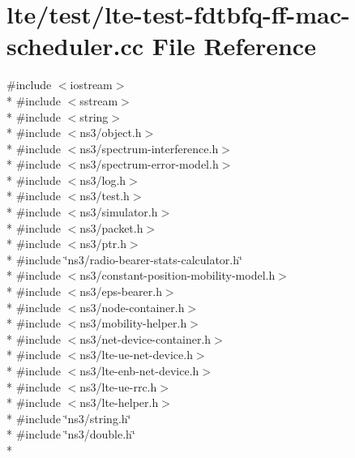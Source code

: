 \hypertarget{lte-test-fdtbfq-ff-mac-scheduler_8cc}{}\section{lte/test/lte-\/test-\/fdtbfq-\/ff-\/mac-\/scheduler.cc File Reference}
\label{lte-test-fdtbfq-ff-mac-scheduler_8cc}
{\ttfamily \#include $<$iostream$>$}\\*
{\ttfamily \#include $<$sstream$>$}\\*
{\ttfamily \#include $<$string$>$}\\*
{\ttfamily \#include $<$ns3/object.\+h$>$}\\*
{\ttfamily \#include $<$ns3/spectrum-\/interference.\+h$>$}\\*
{\ttfamily \#include $<$ns3/spectrum-\/error-\/model.\+h$>$}\\*
{\ttfamily \#include $<$ns3/log.\+h$>$}\\*
{\ttfamily \#include $<$ns3/test.\+h$>$}\\*
{\ttfamily \#include $<$ns3/simulator.\+h$>$}\\*
{\ttfamily \#include $<$ns3/packet.\+h$>$}\\*
{\ttfamily \#include $<$ns3/ptr.\+h$>$}\\*
{\ttfamily \#include \char`\"{}ns3/radio-\/bearer-\/stats-\/calculator.\+h\char`\"{}}\\*
{\ttfamily \#include $<$ns3/constant-\/position-\/mobility-\/model.\+h$>$}\\*
{\ttfamily \#include $<$ns3/eps-\/bearer.\+h$>$}\\*
{\ttfamily \#include $<$ns3/node-\/container.\+h$>$}\\*
{\ttfamily \#include $<$ns3/mobility-\/helper.\+h$>$}\\*
{\ttfamily \#include $<$ns3/net-\/device-\/container.\+h$>$}\\*
{\ttfamily \#include $<$ns3/lte-\/ue-\/net-\/device.\+h$>$}\\*
{\ttfamily \#include $<$ns3/lte-\/enb-\/net-\/device.\+h$>$}\\*
{\ttfamily \#include $<$ns3/lte-\/ue-\/rrc.\+h$>$}\\*
{\ttfamily \#include $<$ns3/lte-\/helper.\+h$>$}\\*
{\ttfamily \#include \char`\"{}ns3/string.\+h\char`\"{}}\\*
{\ttfamily \#include \char`\"{}ns3/double.\+h\char`\"{}}\\*
